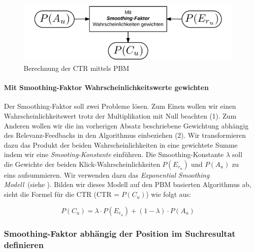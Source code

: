 \begin{figure}[H]
\centering
\vspace{-1em}
\caption[Berechnung der CTR mittels PBM]{Berechnung der CTR mittels PBM}
\label{fig:BerechnungCTRmittelsPBM}
\includegraphics[width=.5\linewidth]{gfx/BerechnungCTRmittelsPBM}
\vspace{-2.5em}
\end{figure}

\paragraph{Mit Smoothing-Faktor Wahrscheinlichkeitswerte gewichten}
Der Smoothing-Faktor soll zwei Probleme lösen. Zum Einen wollen wir einen Wahrscheinlichkeitswert trotz der Multiplikation mit Null beachten (1). Zum Anderen wollen wir die im vorherigen Absatz beschriebene Gewichtung abhängig des Relevanz-Feedbacks in den Algorithmus einbeziehen (2). Wir transformieren dazu das Produkt der beiden Wahrscheinlichkeiten in eine gewichtete Summe indem wir eine \textit{Smooting-Konstante} einführen. Die Smoothing-Konstante $\lambda$ soll die Gewichte der beiden Klick-Wahrscheinlichkeiten $P(E_{r_u})$ und $P(A_{u})$ zu eins aufsummieren. Wir verwenden dazu das \textit{Exponential Smoothing Modell}~(siehe \cite{ExpSmoothing}). Bilden wir dieses Modell auf den PBM basierten Algorithmus ab, sieht die Formel für die CTR (CTR = $P(C_{u})$) wie folgt aus:
  
\vspace{-1.5em}
\begin{equation}
	P(C_{u}) = \lambda\cdot P(E_{r_u}) + (1 - \lambda)\cdot P(A_{u})
\end{equation}
\vspace{-1.5em}

\subsubsection{Smoothing-Faktor abhängig der Position im Suchresultat definieren}
\label{sec:Reranking:Methodik:Result-RerankingPBM:VerhaeltnisKlick-Wahrscheinlichkeiten}

